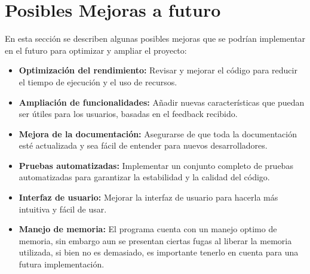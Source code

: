 \section{Posibles Mejoras a futuro}
En esta sección se describen algunas posibles mejoras que se podrían implementar en el futuro para optimizar y ampliar el proyecto:

\begin{itemize}
    \item \textbf{Optimización del rendimiento:} Revisar y mejorar el código para reducir el tiempo de ejecución y el uso de recursos.
    \item \textbf{Ampliación de funcionalidades:} Añadir nuevas características que puedan ser útiles para los usuarios, basadas en el feedback recibido.
    \item \textbf{Mejora de la documentación:} Asegurarse de que toda la documentación esté actualizada y sea fácil de entender para nuevos desarrolladores.
    \item \textbf{Pruebas automatizadas:} Implementar un conjunto completo de pruebas automatizadas para garantizar la estabilidad y la calidad del código.
    \item \textbf{Interfaz de usuario:} Mejorar la interfaz de usuario para hacerla más intuitiva y fácil de usar.
    \item \textbf{Manejo de memoria:} El programa cuenta con un manejo optimo de memoria, sin embargo aun se presentan ciertas fugas al liberar la memoria utilizada, si bien no es demasiado, es importante tenerlo en cuenta para una futura implementación.
\end{itemize}